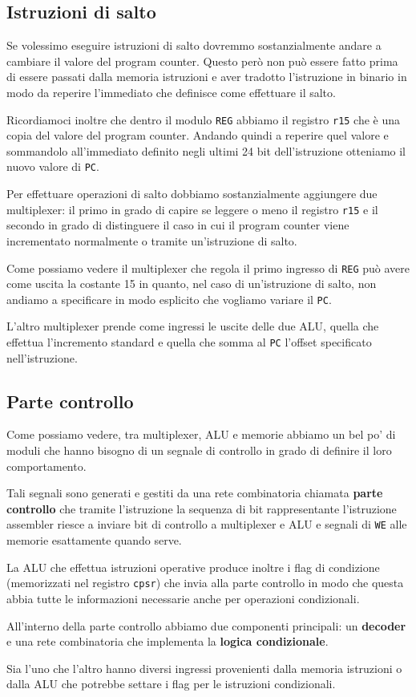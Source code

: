 \subsection{Istruzioni di salto}
Se volessimo eseguire istruzioni di salto dovremmo sostanzialmente andare a cambiare il valore del
program counter. Questo però non può essere fatto prima di essere passati dalla memoria istruzioni
e aver tradotto l'istruzione in binario in modo da reperire l'immediato che definisce come
effettuare il salto.

Ricordiamoci inoltre che dentro il modulo \verb|REG| abbiamo il registro \verb|r15| che è una copia
del valore del program counter. Andando quindi a reperire quel valore e sommandolo all'immediato
definito negli ultimi 24 bit dell'istruzione otteniamo il nuovo valore di \verb|PC|.

Per effettuare operazioni di salto dobbiamo sostanzialmente aggiungere due multiplexer: il primo in
grado di capire se leggere o meno il registro \verb|r15| e il secondo in grado di distinguere il
caso in cui il program counter viene incrementato normalmente o tramite un'istruzione di salto.
\begin{center}
	
\end{center}
Come possiamo vedere il multiplexer che regola il primo ingresso di \verb|REG| può avere come
uscita la costante 15 in quanto, nel caso di un'istruzione di salto, non andiamo a specificare in
modo esplicito che vogliamo variare il \verb|PC|.

L'altro multiplexer prende come ingressi le uscite delle due ALU, quella che effettua l'incremento
standard e quella che somma al \verb|PC| l'offset specificato nell'istruzione.

\subsection{Parte controllo}
Come possiamo vedere, tra multiplexer, ALU e memorie abbiamo un bel po' di moduli che hanno bisogno
di un segnale di controllo in grado di definire il loro comportamento.

Tali segnali sono generati e gestiti da una rete combinatoria chiamata \textbf{parte controllo} che
tramite l'istruzione la sequenza di bit rappresentante l'istruzione assembler riesce a inviare
bit di controllo a multiplexer e ALU e segnali di \verb|WE| alle memorie esattamente quando serve.

La ALU che effettua istruzioni operative produce inoltre i flag di condizione (memorizzati nel
registro \verb|cpsr|) che invia alla parte controllo in modo che questa abbia tutte le informazioni
necessarie anche per operazioni condizionali.
\begin{center}
	
\end{center}
All'interno della parte controllo abbiamo due componenti principali: un \textbf{decoder} e una rete
combinatoria che implementa la \textbf{logica condizionale}.

Sia l'uno che l'altro hanno diversi ingressi provenienti dalla memoria istruzioni o dalla ALU che
potrebbe settare i flag per le istruzioni condizionali.